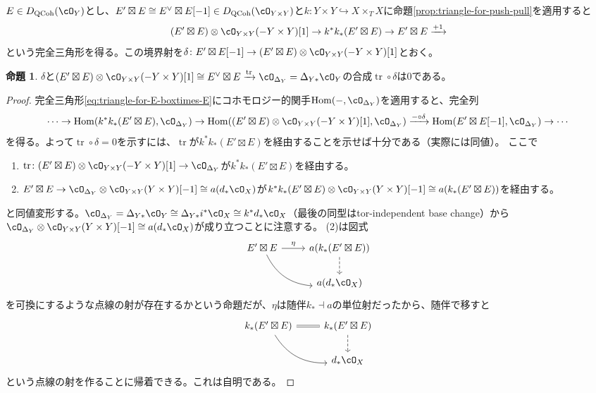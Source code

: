 \documentclass[uplatex, a4paper, dvipdfmx]{jsarticle}
\theoremstyle{definition}
\newtheorem{proposition}[theorem]{命題}
\DeclareMathOperator{\Hom}{\mathrm{Hom}}
\DeclareMathOperator{\QCoh}{\mathrm{QCoh}}
\DeclareMathOperator{\tr}{\mathrm{tr}}
\begin{document}
$E \in D_{\QCoh}(\cO_Y)$とし、$E' \boxtimes E \cong E^\vee \boxtimes E[-1] \in D_{\QCoh}(\cO_{Y\times Y})$と$k \colon Y \times Y \hookrightarrow X \times_T X$に命題\ref{prop:triangle-for-push-pull}を適用すると
\begin{equation}\label{eq:triangle-for-E-boxtimes-E}
    (E' \boxtimes E) \otimes \cO_{Y \times Y}(-Y\times Y)[1] \to k^*k_*(E' \boxtimes E) \to E' \boxtimes E \xrightarrow{+1}
\end{equation}
という完全三角形を得る。この境界射を$\delta \colon E' \boxtimes E[-1] \to (E' \boxtimes E) \otimes \cO_{Y \times Y}(-Y\times Y)[1]$とおく。
\begin{proposition}
    $\delta$と$(E' \boxtimes E) \otimes \cO_{Y \times Y}(-Y\times Y)[1] \cong E^\vee \boxtimes E \xrightarrow{\tr} \cO_{\Delta_Y} = \Delta_{Y*}\cO_Y$の合成$\tr \circ \delta$は$0$である。
\end{proposition}
\begin{proof}
    完全三角形\eqref{eq:triangle-for-E-boxtimes-E}にコホモロジー的関手$\Hom(-, \cO_{\Delta_Y})$を適用すると、完全列
    \begin{equation}
        \cdots \to \Hom(k^*k_*(E' \boxtimes E), \cO_{\Delta_Y}) \to \Hom((E' \boxtimes E) \otimes \cO_{Y \times Y}(-Y\times Y)[1], \cO_{\Delta_Y}) \xrightarrow{-\circ \delta} \Hom(E' \boxtimes E[-1], \cO_{\Delta_Y}) \to \cdots
    \end{equation}
    を得る。よって$\tr \circ \delta = 0$を示すには、$\tr$が$k^*k_*(E' \boxtimes E)$を経由することを示せば十分である（実際には同値）。
    ここで
    \begin{enumerate}
        \item $\tr \colon(E' \boxtimes E) \otimes \cO_{Y \times Y}(-Y\times Y)[1] \to \cO_{\Delta_Y}$が$k^*k_*(E' \boxtimes E)$を経由する。
        \item $E'\boxtimes E \to \cO_{\Delta_Y} \otimes  \cO_{Y \times Y}(Y\times Y)[-1] \cong a(d_*\cO_X)$が$k^*k_*(E' \boxtimes E) \otimes  \cO_{Y \times Y}(Y\times Y)[-1] \cong a(k_*(E' \boxtimes E))$を経由する。
    \end{enumerate}
    と同値変形する。$\cO_{\Delta_Y} = \Delta_{Y*}\cO_Y \cong \Delta_{Y*}i^*\cO_X \cong k^*d_*\cO_X$（最後の同型はtor-independent base change）から$\cO_{\Delta_Y} \otimes \cO_{Y \times Y}(Y\times Y)[-1] \cong a(d_*\cO_X)$が成り立つことに注意する。
    (2)は図式
    \[
        \begin{tikzcd}
            E' \boxtimes E \ar[r, "\eta"] \ar[rd, bend right] &a(k_*(E' \boxtimes E))\ar[d, dashed] \\
            & a(d_*\cO_X)
        \end{tikzcd}
    \]
    を可換にするような点線の射が存在するかという命題だが、$\eta$は随伴$k_* \dashv a$の単位射だったから、随伴で移すと
    \[
        \begin{tikzcd}
            k_*(E' \boxtimes E) \ar[r, equal] \ar[rd, bend right] &k_*(E' \boxtimes E)\ar[d, dashed] \\
            & d_*\cO_X
        \end{tikzcd}
    \]
    という点線の射を作ることに帰着できる。これは自明である。
\end{proof}
\end{document}
